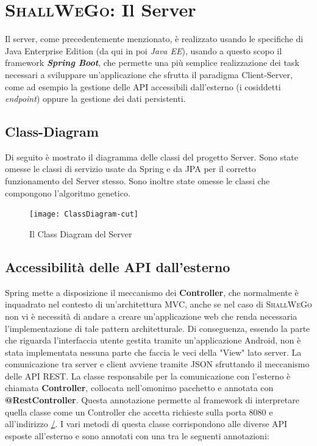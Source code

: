 \section{\textsc{ShallWeGo}: Il Server}
    Il server, come precedentemente menzionato, è realizzato usando le specifiche di Java Enterprise Edition (da qui in poi \textit{Java EE}), usando a questo scopo il framework \textbf{\textit{Spring Boot}}, che permette una più semplice realizzazione dei task necessari a sviluppare un'applicazione che sfrutta il paradigma Client-Server, come ad esempio la gestione delle API accessibili dall'esterno (i cosiddetti \textit{endpoint}) oppure la gestione dei dati persistenti.

    \subsection{Class-Diagram}
        Di seguito è mostrato il diagramma delle classi del progetto Server. Sono state omesse le classi di servizio usate da Spring e da JPA per il corretto funzionamento del Server stesso. Sono inoltre state omesse le classi che compongono l'algoritmo genetico.

        \begin{figure}[H]
            \texttt{[image: ClassDiagram-cut]}
            \caption{Il Class Diagram del Server}
            \label{fig: Il Class Diagram del Server}
        \end{figure}

    \subsection{Accessibilità delle API dall'esterno}
        Spring mette a disposizione il meccanismo dei \textbf{Controller}, che normalmente è inquadrato nel contesto di un'architettura MVC, anche se nel caso di \textsc{ShallWeGo} non vi è necessità di andare a creare un'applicazione web che renda necessaria l'implementazione di tale pattern architetturale. Di conseguenza, essendo la parte che riguarda l'interfaccia utente gestita tramite un'applicazione Android, non è stata implementata nessuna parte che faccia le veci della "View" lato server. La comunicazione tra server e client avviene tramite JSON sfruttando il meccanismo delle API REST. La classe responsabile per la comunicazione con l'esterno è chiamata \textbf{Controller}, collocata nell'omonimo pacchetto e annotata con \textbf{@RestController}. Questa annotazione permette al framework di interpretare quella classe come un Controller che accetta richieste sulla porta 8080 e all'indirizzo \url{/}. I vari metodi di questa classe corrispondono alle diverse API esposte all'esterno e sono annotati con una tra le seguenti annotazioni:

